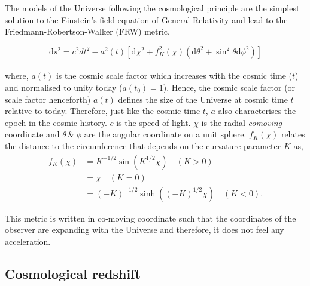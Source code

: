 The models of the Universe following the cosmological principle are the simplest 
solution to the Einstein's field equation of General Relativity and lead to the
Friedmann-Robertson-Walker (FRW) metric,

\begin{equation}
	\mathrm{d}s^2 = c^2dt^2 - a^2(t)\left[ \mathrm{d}\chi^2 + f_K^2(\chi)
					\left( \mathrm{d}\theta^2 + \sin^2\theta \mathrm{d}\phi^2 
					\right)  \right]
	\label{eqn:metric}
\end{equation}
\\
where, $a(t)$ is the cosmic scale factor which increases with the cosmic time ($t$)
and normalised to unity today ($a(t_0)=1$). 
Hence, the cosmic scale factor (or scale factor henceforth) $a(t)$ defines the
size of the Universe at cosmic time $t$ relative to today. Therefore, just like 
the cosmic time $t$, $a$ also characterises the epoch in the cosmic history.
$c$ is the speed of light. $\chi$ is the
radial {\it comoving} coordinate and $\theta\ \& \ \phi$ are the angular coordinate on a
unit sphere. $f_K(\chi)$ relates the distance to the circumference that depends 
on the curvature parameter $K$ as,
\begin{equation} \label{eq1}
\begin{split}
f_K(\chi) & = K^{-1/2} \sin(K^{1/2}\chi) \quad (K>0) \\
 & = \chi \quad (K=0) \\
 & = (-K)^{-1/2} \sinh((-K)^{1/2}\chi) \quad (K<0).
\end{split}
\end{equation}

This metric is written in co-moving coordinate such that the coordinates of the
observer are expanding with the Universe and therefore, it does not feel any
acceleration. 



\subsection{Cosmological redshift}

